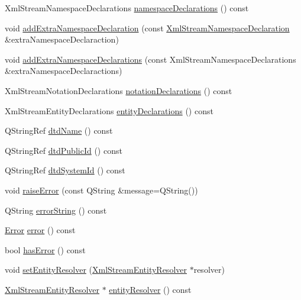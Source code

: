 \begin{DoxyCompactItemize}
\item 
Xml\+Stream\+Namespace\+Declarations \hyperlink{class_xml_stream_reader_a3e6033d64f3744d90e96287f3a04d913}{namespace\+Declarations} () const
\item 
void \hyperlink{class_xml_stream_reader_a6c6b71cc9f62ad5c1b85c207ba1be850}{add\+Extra\+Namespace\+Declaration} (const \hyperlink{class_xml_stream_namespace_declaration}{Xml\+Stream\+Namespace\+Declaration} \&extra\+Namespace\+Declaraction)
\item 
void \hyperlink{class_xml_stream_reader_a8661643768d54c1c49645a59abed5d29}{add\+Extra\+Namespace\+Declarations} (const Xml\+Stream\+Namespace\+Declarations \&extra\+Namespace\+Declaractions)
\item 
Xml\+Stream\+Notation\+Declarations \hyperlink{class_xml_stream_reader_af1980e6e4fa0ec4468bb384000bf33db}{notation\+Declarations} () const
\item 
Xml\+Stream\+Entity\+Declarations \hyperlink{class_xml_stream_reader_a1746b1c8df6ec7a4172c5dbee907bfb3}{entity\+Declarations} () const
\item 
Q\+String\+Ref \hyperlink{class_xml_stream_reader_a17977920c069d3e4a71182aa07cb4eaa}{dtd\+Name} () const
\item 
Q\+String\+Ref \hyperlink{class_xml_stream_reader_a5b8d61714dde7a6f75aa16555b85db18}{dtd\+Public\+Id} () const
\item 
Q\+String\+Ref \hyperlink{class_xml_stream_reader_a8021ea53fd25af7404bfe81a2e4e7bdd}{dtd\+System\+Id} () const
\item 
void \hyperlink{class_xml_stream_reader_aae008ac9078fb7edb4a77ba3e76b8dfa}{raise\+Error} (const Q\+String \&message=Q\+String())
\item 
Q\+String \hyperlink{class_xml_stream_reader_a119d913daa2a7b8174f0b26dcd7e9720}{error\+String} () const
\item 
\hyperlink{class_xml_stream_reader_ae7aa6749ae6e9de9bcb6f084a9884286}{Error} \hyperlink{class_xml_stream_reader_ae9a7e8fe9f15b0f5c4ec5fa080c6249f}{error} () const
\item 
bool \hyperlink{class_xml_stream_reader_a26bc2d6831322e5a1d86182295f912d0}{has\+Error} () const
\item 
void \hyperlink{class_xml_stream_reader_af77e0f8b78b6cedfaec4a34634670893}{set\+Entity\+Resolver} (\hyperlink{class_xml_stream_entity_resolver}{Xml\+Stream\+Entity\+Resolver} $\ast$resolver)
\item 
\hyperlink{class_xml_stream_entity_resolver}{Xml\+Stream\+Entity\+Resolver} $\ast$ \hyperlink{class_xml_stream_reader_aac2531acc527bccec511df4c29ed2ff8}{entity\+Resolver} () const
\end{DoxyCompactItemize}


